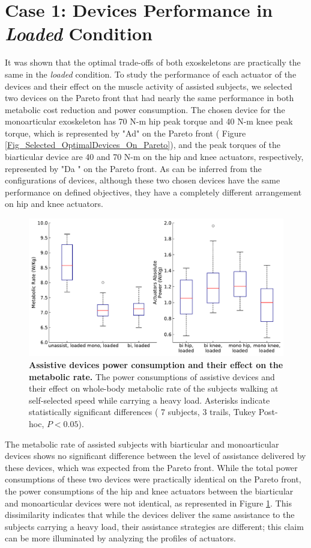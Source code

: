 \documentclass[10pt,letterpaper]{article}
\begin{document}
\section*{Case 1: Devices Performance in \textit{Loaded} Condition}
It was shown that the optimal trade-offs of both exoskeletons are practically the same in the {\it loaded} condition. To study the performance of each actuator of the devices and their effect on the muscle activity of assisted subjects, we selected two devices on the Pareto front that had nearly the same performance in both metabolic cost reduction and power consumption. The chosen device for the monoarticular exoskeleton has 70 N-m hip peak torque and 40 N-m knee peak torque, which is represented by "Ad" on the Pareto front ( Figure \ref{Fig_Selected_OptimalDevices_On_Pareto}), and the peak torques of the biarticular device are 40 and 70 N-m on the hip and knee actuators, respectively, represented by "Da " on the Pareto front. As can be inferred from the configurations of devices, although these two chosen devices have the same performance on defined objectives, they have a completely different arrangement on hip and knee actuators.
\begin{figure}[ht]   
	\centering
	\includegraphics[width=\linewidth]{Case_Studies/LoadedMono04_LoadedBi16/PaperFigure_BoxPlot.pdf}
	\vspace{1mm}
	\caption{\small{\textbf{Assistive devices power consumption and their effect on the metabolic rate.} The power consumptions of assistive devices and their effect on whole-body metabolic rate of the subjects walking at self-selected speed while carrying a heavy load. Asterisks indicate statistically significant differences ( 7 subjects, 3 trails, Tukey Post-hoc, $P < 0.05$).}}
	\label{Fig_Case01_Energy_Plot}
\end{figure}
The metabolic rate of assisted subjects with biarticular and monoarticular devices shows no significant difference between the level of assistance delivered by these devices, which was expected from the Pareto front. While the total power consumptions of these two devices were practically identical on the Pareto front, the power consumptions of the hip and knee actuators between the biarticular and monoarticular devices were not identical, as represented in Figure \ref{Fig_Case01_Energy_Plot}. This dissimilarity indicates that while the devices deliver the same assistance to the subjects carrying a heavy load, their assistance strategies are different; this claim can be more illuminated by analyzing the profiles of actuators.\\
\end{document}
